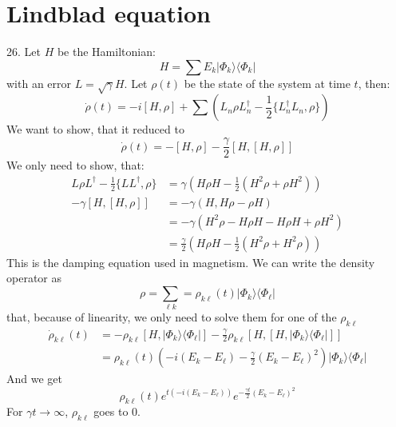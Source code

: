 \documentclass[12pt]{book}
\theoremstyle{definition}
\let\oldsum\sum
\renewcommand{\sum}[2]{\oldsum\limits_{#1}^{#2}}
\let\shortto\to
\renewcommand{\to}{\longrightarrow}
\newcommand{\para}[1]{\left( {#1} \right)}
\newcommand{\bra}[1]{\langle {#1} \vert}
\newcommand{\ket}[1]{\vert {#1} \rangle}
\begin{document}
\section{Lindblad equation}
26. Let $H$ be the Hamiltonian:
\begin{equation*}
  H = \oldsum E_k \ket{\Phi_k}\bra{\Phi_k}
\end{equation*}
with an error $L = \sqrt{\gamma}H$. Let $\rho(t)$ be the state of the system at time $t$, then:
\begin{equation*}
  \dot{\rho}(t) = - i [H, \rho] + \oldsum \para{L_n \rho L_n^\dagger - \frac{1}{2}\{L_n^\dagger L_n, \rho\}}
\end{equation*}
We want to show, that it reduced to
\begin{equation*}
  \dot{\rho}(t) = - [H, \rho] - \frac{\gamma}{2} [H, [H, \rho]]
\end{equation*}
We only need to show, that:
\begin{align*}
  L \rho L^\dagger - \frac{1}{2} \{LL^\dagger, \rho\} & = \gamma \para{H \rho H - \frac{1}{2} (H^2\rho + \rho H^2)} \\
  -\gamma [H, [H, \rho]] & = -\gamma \para{H, H \rho - \rho H} \\
  & = -\gamma \para{H^2 \rho - H \rho H - H\rho H + \rho H^2} \\
  & = \frac{\gamma}{2} \para{ H \rho H - \frac{1}{2}(H^2 \rho + H^2 \rho)}
\end{align*}
This is the damping equation used in magnetism.
We can write the density operator as
\begin{equation*}
   \rho = \oldsum_{\ell k} = \rho_{k\ell}(t) \ket{\Phi_k} \bra{\Phi_\ell}
\end{equation*}
that, because of linearity, we only need to solve them for one of the $\rho_{k\ell}$
\begin{align*}
  \dot{\rho}_{k\ell}(t) & = - \rho_{k\ell} [H, \ket{\Phi_k}\bra{\Phi_\ell}] - \frac{\gamma}{2} \rho_{k\ell} [H, [H, \ket{\Phi_k}\bra{\Phi_\ell}]] \\
  & = \rho_{k\ell}(t) \para{-i (E_k - E_\ell) - \frac{\gamma}{2} (E_k - E_\ell)^2} \ket{\Phi_k}\bra{\Phi_\ell}
\end{align*}
And we get
\begin{equation*}
  \rho_{k\ell} (t) e^{t(-i(E_k - E_\ell))} e^{-\frac{\gamma t}{2}(E_k - E_\ell)^2}
\end{equation*}
For $\gamma t \shortto \infty$, $\rho_{k\ell}$ goes to $0$.
\end{document}
